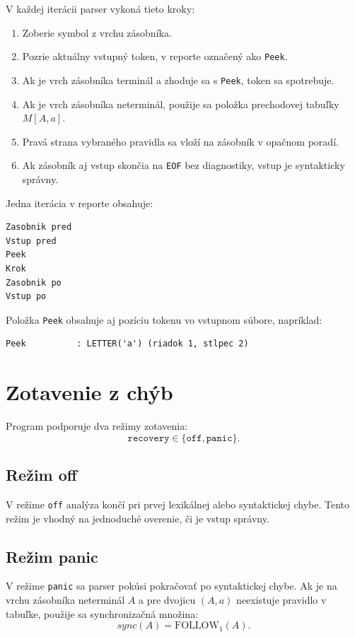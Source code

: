 \documentclass[12pt,a4paper]{article}
\newcommand{\Follow}{\mathrm{FOLLOW}_1}
\newcommand{\code}[1]{\ifmmode\text{\ttfamily #1}\else\texttt{#1}\fi}
\begin{document}
V každej iterácii parser vykoná tieto kroky:

\begin{enumerate}
    \item Zoberie symbol z vrchu zásobníka.
    \item Pozrie aktuálny vstupný token, v reporte označený ako \code{Peek}.
    \item Ak je vrch zásobníka terminál a zhoduje sa s \code{Peek}, token sa spotrebuje.
    \item Ak je vrch zásobníka neterminál, použije sa položka prechodovej tabuľky \(M[A,a]\).
    \item Pravá strana vybraného pravidla sa vloží na zásobník v opačnom poradí.
    \item Ak zásobník aj vstup skončia na \code{EOF} bez diagnostiky, vstup je syntakticky správny.
\end{enumerate}

Jedna iterácia v reporte obsahuje:

\begin{lstlisting}
Zasobnik pred
Vstup pred
Peek
Krok
Zasobnik po
Vstup po
\end{lstlisting}

Položka \code{Peek} obsahuje aj pozíciu tokenu vo vstupnom súbore, napríklad:
\begin{lstlisting}
Peek          : LETTER('a') (riadok 1, stlpec 2)
\end{lstlisting}

\section{Zotavenie z chýb}

Program podporuje dva režimy zotavenia:
\[
\texttt{recovery} \in \{\texttt{off}, \texttt{panic}\}.
\]

\subsection{Režim off}

V režime \code{off} analýza končí pri prvej lexikálnej alebo syntaktickej chybe. Tento režim je vhodný na jednoduché overenie, či je vstup správny.

\subsection{Režim panic}

V režime \code{panic} sa parser pokúsi pokračovať po syntaktickej chybe. Ak je na vrchu zásobníka neterminál \(A\) a pre dvojicu \((A,a)\) neexistuje pravidlo v tabuľke, použije sa synchronizačná množina:
\[
sync(A) = \Follow(A).
\]
\end{document}
